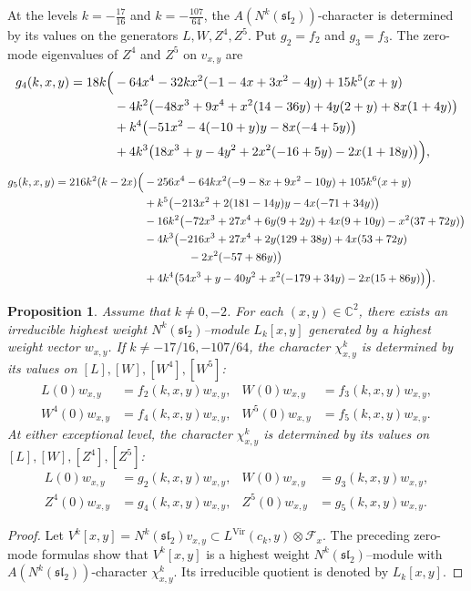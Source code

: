 \documentclass[11 pt]{amsart}
\newtheorem{proposition}{Proposition}
\theoremstyle{definition}
\theoremstyle{plain}
\newcommand{\Vir}{\mathrm{Vir}}
\begin{document}
At the levels $k=-\frac{17}{16}$ and $k=-\frac{107}{64}$, the
$A(N^k(\mathfrak{sl}_2))$-character is determined by its values on the
generators $L,W,Z^4,Z^5$. Put
$g_2=f_2$ and $g_3=f_3$.
The zero-mode eigenvalues of $Z^4$ and $Z^5$ on $v_{x,y}$ are
\begin{align}
 g_4(k,x,y)=18k\Bigl(&
 -64x^4-32kx^2(-1-4x+3x^2-4y)+15k^5(x+y) \notag\\
&-4k^2\bigl(-48x^3+9x^4+x^2(14-36y)+4y(2+y)+8x(1+4y)\bigr)\notag\\
&+k^4\bigl(-51x^2-4(-10+y)y-8x(-4+5y)\bigr) \notag\\
&+4k^3\bigl(18x^3+y-4y^2+2x^2(-16+5y)-2x(1+18y)\bigr)
\Bigr),
\label{eq:g4-main}
\end{align}
\begin{align}
 g_5(k,x,y)=216k^2(k-2x)\Bigl(&
 -256x^4-64kx^2(-9-8x+9x^2-10y)+105k^6(x+y)\notag\\
&+k^5\bigl(-213x^2+2(181-14y)y-4x(-71+34y)\bigr)\notag\\
&-16k^2\bigl(-72x^3+27x^4+6y(9+2y)+4x(9+10y)-x^2(37+72y)\bigr)\notag\\
&-4k^3\bigl(-216x^3+27x^4+2y(129+38y)+4x(53+72y)\notag\\
&\qquad\qquad -2x^2(-57+86y)\bigr)\notag\\
&+4k^4\bigl(54x^3+y-40y^2+x^2(-179+34y)-2x(15+86y)\bigr)
\Bigr).
\label{eq:g5-main}
\end{align}

\begin{proposition}\label{prop:existence-Lxy}
Assume that $k\neq0,-2$. For each $(x,y)\in\mathbb C^2$, there exists an
irreducible highest weight $N^k(\mathfrak{sl}_2)$--module $L_k[x,y]$
generated by a highest weight vector $w_{x,y}$. If
$k\neq-17/16,-107/64$, the character $\chi^k_{x,y}$ is determined by its values on
$[L],[W],[W^4],[W^5]$:
\[
\begin{aligned}
L(0)w_{x,y}&=f_2(k,x,y)w_{x,y},
& W(0)w_{x,y}&=f_3(k,x,y)w_{x,y},\\
W^4(0)w_{x,y}&=f_4(k,x,y)w_{x,y},
& W^5(0)w_{x,y}&=f_5(k,x,y)w_{x,y}.
\end{aligned}
\]
At either exceptional level, the character $\chi^k_{x,y}$ is determined
by its values on $[L],[W],[Z^4],[Z^5]$:
\[
\begin{aligned}
L(0)w_{x,y}&=g_2(k,x,y)w_{x,y},
& W(0)w_{x,y}&=g_3(k,x,y)w_{x,y},\\
Z^4(0)w_{x,y}&=g_4(k,x,y)w_{x,y},
& Z^5(0)w_{x,y}&=g_5(k,x,y)w_{x,y}.
\end{aligned}
\]
\end{proposition}
\begin{proof}
Let $V^k[x,y]=N^k(\mathfrak{sl}_2)v_{x,y}
\subset L^{\Vir}(c_k,y)\otimes\mathcal F_x$.
The preceding zero-mode formulas show that $V^k[x,y]$ is a highest weight
$N^k(\mathfrak{sl}_2)$--module with $A(N^k(\mathfrak{sl}_2))$-character
$\chi^k_{x,y}$.  Its irreducible quotient is denoted by $L_k[x,y]$.
\end{proof}
\end{document}
